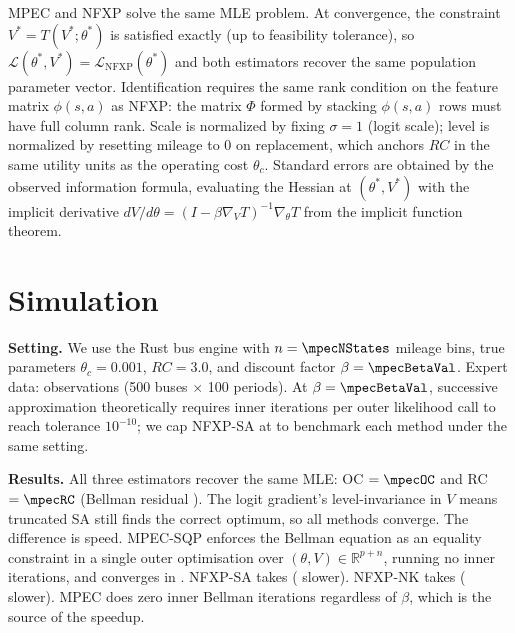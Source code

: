 \documentclass[10pt]{article}
\begin{document}
MPEC and NFXP solve the same MLE problem.
At convergence, the constraint $V^* = T(V^*;\theta^*)$ is satisfied exactly (up to feasibility tolerance), so $\mathcal{L}(\theta^*, V^*) = \mathcal{L}_{\text{NFXP}}(\theta^*)$ and both estimators recover the same population parameter vector.
Identification requires the same rank condition on the feature matrix $\phi(s,a)$ as NFXP: the matrix $\Phi$ formed by stacking $\phi(s,a)$ rows must have full column rank.
Scale is normalized by fixing $\sigma = 1$ (logit scale); level is normalized by resetting mileage to 0 on replacement, which anchors $RC$ in the same utility units as the operating cost $\theta_c$.
Standard errors are obtained by the observed information formula, evaluating the Hessian at $(\theta^*, V^*)$ with the implicit derivative $dV/d\theta = (I - \beta \nabla_V T)^{-1} \nabla_\theta T$ from the implicit function theorem.

\section{Simulation}



\textbf{Setting.}
We use the Rust bus engine with $n = \mpecNStates$ mileage bins, true parameters $\theta_c = 0.001$, $RC = 3.0$, and discount factor $\beta = \mpecBetaVal$.
Expert data: \mpecNObs{} observations (500 buses $\times$ 100 periods).
At $\beta = \mpecBetaVal$, successive approximation theoretically requires \mpecSANeeded{} inner iterations per outer likelihood call to reach tolerance $10^{-10}$; we cap NFXP-SA at \mpecSABudget{} to benchmark each method under the same setting.

\textbf{Results.}
All three estimators recover the same MLE: OC $= \mpecOC$ and RC $= \mpecRC$ (Bellman residual \mpecCV{}).
The logit gradient's level-invariance in $V$ means truncated SA still finds the correct optimum, so all methods converge.
The difference is speed.
MPEC-SQP enforces the Bellman equation as an equality constraint in a single outer optimisation over $(\theta, V) \in \mathbb{R}^{p+n}$, running no inner iterations, and converges in \mpecMPECTime{}.
NFXP-SA takes \mpecNFXPTime{} (\mpecSpeedup{} slower).
NFXP-NK \citep{iskhakovRustSchjerning2016} takes \mpecNKTime{} (\mpecNKSpeedup{} slower).
MPEC does zero inner Bellman iterations regardless of $\beta$, which is the source of the speedup.
\end{document}
